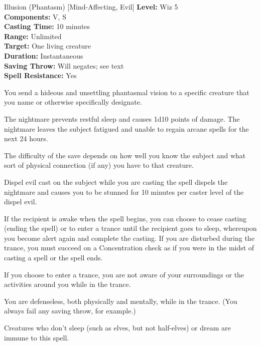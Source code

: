 {Illusion (Phantasm) [Mind-Affecting, Evil]}
{
	\textbf{Level:}
	Wiz 5\\
	\textbf{Components:}
	V, S\\
	\textbf{Casting Time:}
	10 minutes\\
	\textbf{Range:}
	Unlimited\\
	\textbf{Target:}
	One living creature\\
	\textbf{Duration:}
	Instantaneous\\
	\textbf{Saving Throw:}
	Will negates; see text\\
	\textbf{Spell Resistance:}
	Yes\\
}
{
	You send a hideous and unsettling phantasmal vision to a specific creature that you name or otherwise specifically designate.

	The nightmare prevents restful sleep and causes 1d10 points of damage. The nightmare leaves the subject fatigued and unable to regain arcane spells for the next 24 hours.

	The difficulty of the save depends on how well you know the subject and what sort of physical connection (if any) you have to that creature.

Dispel evil cast on the subject while you are casting the spell dispels the nightmare and causes you to be stunned for 10 minutes per caster level of the dispel evil.

	If the recipient is awake when the spell begins, you can choose to cease casting (ending the spell) or to enter a trance until the recipient goes to sleep, whereupon you become alert again and complete the casting. If you are disturbed during the trance, you must succeed on a Concentration check as if you were in the midst of casting a spell or the spell ends.

	If you choose to enter a trance, you are not aware of your surroundings or the activities around you while in the trance.

	You are defenseless, both physically and mentally, while in the trance. (You always fail any saving throw, for example.)

	Creatures who don't sleep (such as elves, but not half-elves) or dream are immune to this spell.

}
